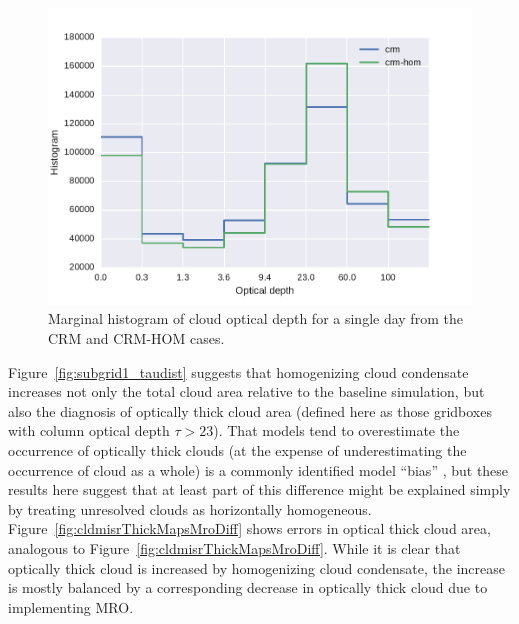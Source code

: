 \begin{figure}[htbp]
\centering
\includegraphics{graphics/subgrid1_taudist.pdf}
\caption{\label{fig:subgrid1_taudist}Marginal histogram of cloud optical
depth for a single day from the CRM and CRM-HOM
cases.}\label{fig:subgrid1ux5ftaudist}
\end{figure}

Figure~\ref{fig:subgrid1_taudist} suggests that homogenizing cloud
condensate increases not only the total cloud area relative to the
baseline simulation, but also the diagnosis of optically thick cloud
area (defined here as those gridboxes with column optical depth
\(\tau > 23\)). That models tend to overestimate the occurrence of
optically thick clouds (at the expense of underestimating the occurrence
of cloud as a whole) is a commonly identified model ``bias''
\citep{zhang_et_al_2005, nam_et_al_2012, kay_et_al_2012, klein_et_al_2013},
but these results here suggest that at least part of this difference
might be explained simply by treating unresolved clouds as horizontally
homogeneous. Figure~\ref{fig:cldmisrThickMapsMroDiff} shows errors in
optical thick cloud area, analogous to
Figure~\ref{fig:cldmisrThickMapsMroDiff}. While it is clear that
optically thick cloud is increased by homogenizing cloud condensate, the
increase is mostly balanced by a corresponding decrease in optically
thick cloud due to implementing MRO.

